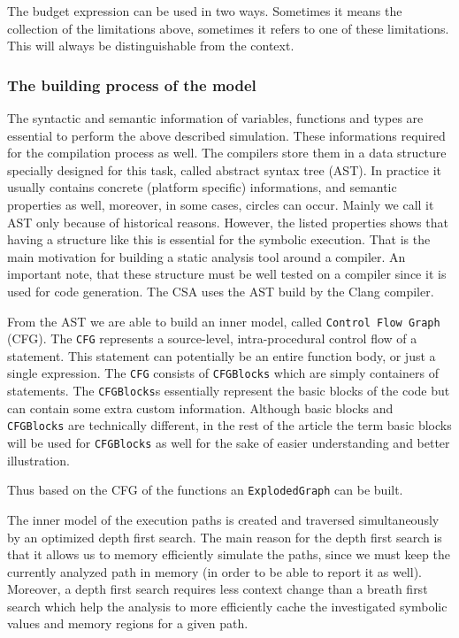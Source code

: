 The budget expression can be used in two ways. Sometimes it means the
collection of the limitations above, sometimes it refers to one of these
limitations. This will always be distinguishable from the context.

\subsubsection{The building process of the model}
The syntactic and semantic information of variables, functions and types
are essential to perform the above described simulation. These informations 
required for the compilation process as well. The compilers store them in a 
data structure specially designed for this task, called abstract syntax tree 
(AST). In practice it usually contains concrete (platform specific) 
informations, and semantic properties as well, moreover, in some cases, circles 
can occur. Mainly we call it AST only because of historical reasons. 
However, the listed properties shows that having a structure like this is 
essential for the symbolic execution. That is the main motivation for building 
a static analysis tool around a compiler. An important note, that these 
structure must be well tested on a compiler since it is used for code 
generation. The CSA uses the AST build by the Clang compiler.

From the AST we are able to build an inner model, called \texttt{Control Flow 
Graph} (CFG). The \texttt{CFG} represents a source-level, intra-procedural 
control flow of a statement. This statement can potentially be an entire 
function body, or just a single expression. The \texttt{CFG} consists of 
\texttt{CFGBlocks} which are simply containers of statements. The 
\texttt{CFGBlocks}s essentially represent the basic blocks of the code but can 
contain some extra custom information. 
Although basic blocks and \texttt{CFGBlocks} are technically different, in the 
rest of the article the term basic blocks will be used for \texttt{CFGBlocks} 
as well for the sake of easier understanding and better illustration.

Thus based on the CFG of the functions an \texttt{ExplodedGraph} can be built.

The inner model of the execution paths is created and traversed simultaneously 
by an optimized depth first search. The main reason for the depth first search 
is that it allows us to memory efficiently simulate the paths, since we must 
keep the currently analyzed path in memory (in order to be able to report it as 
well). Moreover, a depth first search requires less context change than a 
breath first search which help the analysis to more efficiently cache the 
investigated symbolic values and memory regions for a given path.

